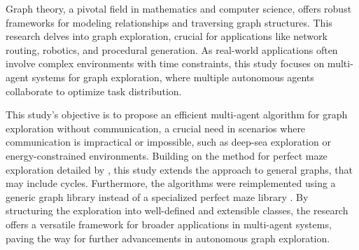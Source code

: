 Graph theory, a pivotal field in mathematics and computer science, offers robust frameworks for modeling relationships and traversing graph structures.
This research delves into graph exploration,
crucial for applications like network routing, robotics, and procedural generation.
As real-world applications often involve complex environments with time constraints,
this study focuses on multi-agent systems for graph exploration,
where multiple autonomous agents collaborate to optimize task distribution.

This study's objective is to propose an efficient multi-agent algorithm for graph exploration without communication,
a crucial need in scenarios where communication is impractical or impossible,
such as deep-sea exploration or energy-constrained environments.
Building on the method for perfect maze exploration detailed by ,
this study extends the approach to general graphs, that may include cycles.
Furthermore, the algorithms were reimplemented using a generic graph library
instead of a specialized perfect maze library \cite{Naeem2021}.
By structuring the exploration into well-defined and extensible classes,
the research offers a versatile framework for broader applications in multi-agent systems,
paving the way for further advancements in autonomous graph exploration.